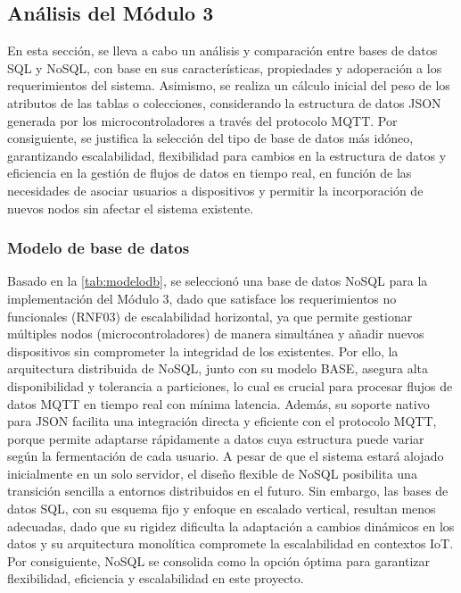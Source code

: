 \subsection{Análisis del Módulo 3}
\label{sec:mod3}
En esta sección, se lleva a cabo un análisis y comparación entre bases de datos SQL y NoSQL, 
con base en sus características, propiedades y adoperación a los requerimientos del sistema. 
Asimismo, se realiza un cálculo inicial del peso de los atributos de las tablas o colecciones, 
considerando la estructura de datos JSON generada por los microcontroladores a través del
protocolo MQTT. Por consiguiente, se justifica la selección del tipo de base de datos más idóneo,
garantizando escalabilidad, flexibilidad para cambios en la estructura de datos y eficiencia en 
la gestión de flujos de datos en tiempo real, en función de las necesidades de asociar usuarios
a dispositivos y permitir la incorporación de nuevos nodos sin afectar el sistema existente. 

\subsubsection{Modelo de base de datos}
Basado en la \cref{tab:modelodb}, se seleccionó una base de datos NoSQL para 
la implementación del Módulo 3, dado que satisface los requerimientos
no funcionales (RNF03) de escalabilidad horizontal, ya que permite gestionar 
múltiples nodos (microcontroladores) de manera simultánea y añadir nuevos
dispositivos sin comprometer la integridad de los existentes. Por ello,
la arquitectura distribuida de NoSQL, junto con su modelo BASE, asegura
alta disponibilidad y tolerancia a particiones, lo cual es crucial para procesar 
flujos de datos MQTT en tiempo real con mínima latencia. Además, 
su soporte nativo para JSON facilita una integración directa y 
eficiente con el protocolo MQTT, porque permite adaptarse rápidamente a 
datos cuya estructura puede variar según la fermentación de cada usuario.
\newline
A pesar de que el sistema estará alojado inicialmente en un solo servidor, 
el diseño flexible de NoSQL posibilita una transición sencilla a entornos 
distribuidos en el futuro. Sin embargo, las bases de datos SQL, con su esquema 
fijo y enfoque en escalado vertical, resultan menos adecuadas, dado que su 
rigidez dificulta la adaptación a cambios dinámicos en los datos y su arquitectura
monolítica compromete la escalabilidad en contextos IoT. Por consiguiente,
NoSQL se consolida como la opción óptima para garantizar flexibilidad, 
eficiencia y escalabilidad en este proyecto.


